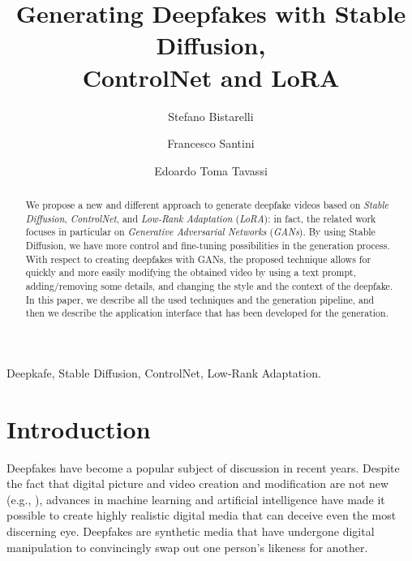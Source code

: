 \documentclass[preprint]{elsarticle}
\begin{document}
\begin{frontmatter}


\title{Generating Deepfakes with Stable Diffusion,\\ ControlNet and LoRA}





\author[perugia]{Stefano Bistarelli}
\author[perugia]{Francesco Santini}
\author[perugia]{Edoardo Toma Tavassi}


\address[perugia]{Dipartimento di Matematica e  Informatica, University of Perugia, Italy}




\begin{abstract} 
We propose a new and different approach to generate deepfake videos based on \emph{Stable Diffusion}, \emph{ControlNet}, and \emph{Low-Rank Adaptation} (\emph{LoRA}): in fact, the related work focuses in particular on \emph{Generative Adversarial Networks} (\emph{GANs}). By using Stable Diffusion, we  have more control and fine-tuning possibilities in the generation process. With respect to creating deepfakes with GANs, the proposed technique allows for quickly and more easily modifying the obtained video by  using a text prompt, adding/removing some details, and changing the style  and the context of the deepfake. In this paper, we describe all the used techniques and the generation pipeline, and then we describe the application interface that has been developed for the generation.
\end{abstract}

\begin{keyword}
Deepkafe, Stable Diffusion, ControlNet, Low-Rank Adaptation.
\end{keyword}
\end{frontmatter}



\section{Introduction}\label{sec:intro}
Deepfakes have become a popular subject of discussion in recent years. 
Despite the fact that digital picture and video creation and modification are not new (e.g., \cite{farid}), advances in machine learning and artificial intelligence have made it possible to create highly realistic digital media that can deceive even the most discerning eye. Deepfakes are synthetic media that have undergone digital manipulation to convincingly swap out one person's likeness for another.
\end{document}
